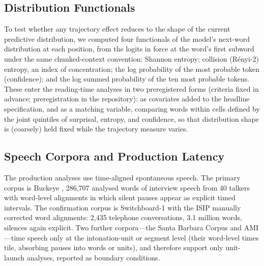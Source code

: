 \documentclass[12pt]{article}
\newcommand{\new}[1]{#1}   %
\begin{document}
\new{\subsection{Distribution Functionals}

To test whether any trajectory effect reduces to the shape of the current predictive distribution, we computed four functionals of the model's next-word distribution at each position, from the logits in force at the word's first subword under the same chunked-context convention: Shannon entropy; collision (R\'enyi-2) entropy, an index of concentration; the log probability of the most probable token (confidence); and the log summed probability of the ten most probable tokens. These enter the reading-time analyses in two preregistered forms (criteria fixed in advance; preregistration in the repository): as covariates added to the headline specification, and as a matching variable, comparing words within cells defined by the joint quintiles of surprisal, entropy, and confidence, so that distribution shape is (coarsely) held fixed while the trajectory measure varies.

\subsection{Speech Corpora and Production Latency}

The production analyses use time-aligned spontaneous speech. The primary corpus is Buckeye \citep{pitt2007}, 286,707 analysed words of interview speech from 40 talkers with word-level alignments in which silent pauses appear as explicit timed intervals. The confirmation corpus is Switchboard-1 \citep{godfrey1992} with the ISIP manually corrected word alignments: 2,435 telephone conversations, 3.1 million words, silences again explicit. Two further corpora---the Santa Barbara Corpus \citep{dubois2000} and AMI \citep{carletta2007}---time speech only at the intonation-unit or segment level (their word-level times tile, absorbing pauses into words or units), and therefore support only unit-launch analyses, reported as boundary conditions.

}
\end{document}

